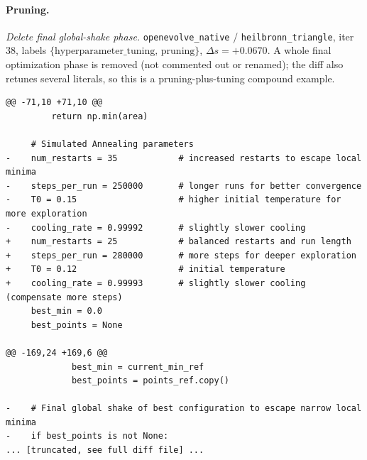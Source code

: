 \paragraph{Pruning.}
\textit{Delete final global-shake phase.} \texttt{openevolve\_native} / \texttt{heilbronn\_triangle}, iter $38$, labels $\{\text{hyperparameter\_tuning},\,\text{pruning}\}$, $\Delta s = +0.0670$. A whole final optimization phase is removed (not commented out or renamed); the diff also retunes several literals, so this is a pruning-plus-tuning compound example.
{\scriptsize
\begin{verbatim}
@@ -71,10 +71,10 @@
         return np.min(area)

     # Simulated Annealing parameters
-    num_restarts = 35            # increased restarts to escape local minima
-    steps_per_run = 250000       # longer runs for better convergence
-    T0 = 0.15                    # higher initial temperature for more exploration
-    cooling_rate = 0.99992       # slightly slower cooling
+    num_restarts = 25            # balanced restarts and run length
+    steps_per_run = 280000       # more steps for deeper exploration
+    T0 = 0.12                    # initial temperature
+    cooling_rate = 0.99993       # slightly slower cooling (compensate more steps)
     best_min = 0.0
     best_points = None

@@ -169,24 +169,6 @@
             best_min = current_min_ref
             best_points = points_ref.copy()

-    # Final global shake of best configuration to escape narrow local minima
-    if best_points is not None:
... [truncated, see full diff file] ...
\end{verbatim}
}

